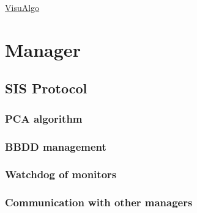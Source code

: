 \documentclass[a4paper,12pt]{article}
\begin{document}
\href{http://visualgo.net}{VisuAlgo}

\section{Manager}

\subsection{SIS Protocol}

\subsubsection{PCA algorithm}

\subsubsection{BBDD management}

\subsubsection{Watchdog of monitors}

\subsubsection{Communication with other managers}
\end{document}
